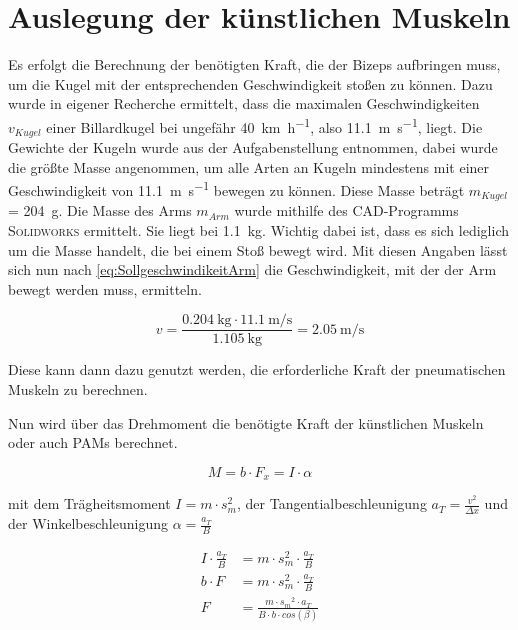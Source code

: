 	\section{Auslegung der künstlichen Muskeln}

		Es erfolgt die Berechnung der benötigten Kraft, die der Bizeps aufbringen muss, um die Kugel mit der entsprechenden Geschwindigkeit stoßen zu können. 
		Dazu wurde in eigener Recherche ermittelt, dass die maximalen Geschwindigkeiten \(v_{Kugel}\) einer Billardkugel bei ungefähr \SI{40}{\kilo\metre\per\hour}, also \SI{11,1}{\metre\per\second}, liegt.
		Die Gewichte der Kugeln wurde aus der Aufgabenstellung entnommen, dabei wurde die größte Masse angenommen, um alle Arten an Kugeln mindestens mit einer Geschwindigkeit von \SI{11,1}{\metre\per\second} bewegen zu können.
		Diese Masse beträgt \(m_{Kugel}\) = \SI{204}{\gram}.
		Die Masse des Arms \(m_{Arm}\) wurde mithilfe des CAD-Programms \textsc{Solidworks} ermittelt. Sie liegt bei \SI{1,1}{\kilo\gram}.
		Wichtig dabei ist, dass es sich lediglich um die Masse handelt, die bei einem Stoß bewegt wird. 
		Mit diesen Angaben lässt sich nun nach \cref{eq:SollgeschwindikeitArm} die Geschwindigkeit, mit der der Arm bewegt werden muss, ermitteln. 

		\begin{equation}
			v= \frac{\SI{0,204}{\kilogram} \cdot \SI{11,1}{\metre\per\second}}{\SI{1,105}{\kilogram}} = \SI{2,05}{\metre\per\second}
			\label{eq:SollgeschwindikeitArmZahlen}
		\end{equation}

		Diese kann dann dazu genutzt werden, die erforderliche Kraft der pneumatischen Muskeln zu berechnen. \par
		Nun wird über das Drehmoment die benötigte Kraft der künstlichen Muskeln oder auch PAMs berechnet. 

		\begin{equation}
			M = b \cdot F_x = I \cdot \alpha%
			\label{eq:DrehmomentArm}
		\end{equation}

		mit dem Trägheitsmoment \( I = m \cdot s_m^2 \), der Tangentialbeschleunigung \( a_T = \frac{v^2}{\Delta x} \) und der
		Winkelbeschleunigung \( \alpha = \frac{a_T}{B} \) \par\medskip

		\begin{align}
			I \cdot \frac{a_T}{B} &= m \cdot s_m^2 \cdot \frac{a_T}{B} \nonumber\\
			b \cdot F &= m \cdot s_m^2 \cdot \frac{a_T}{B} \nonumber\\
			F &=\frac{m \cdot {s_m}^2 \cdot a_T}{B \cdot b \cdot cos(\beta)}%
			\label{eq:Kraft-PAM}
		\end{align}

